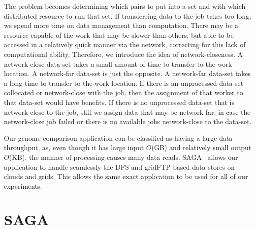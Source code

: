 \documentclass{rspublic}
\newcommand{\micnote}[1]{ {\textcolor{blue} { ***Michael: #1 }}}
\newcommand{\betynote}[1]{ {\textcolor{orange} { ***Bety: #1 }}}
\newcommand{\jhanote}[1]{} \newcommand{\micnote}[1]{}\newcommand{\betynote}[1]{} \newcommand{\fixme}[1]{}
\begin{document}
The problem becomes determining which pairs to put into a set and with which
distributed resource to run that set. If transferring data to the job
takes too long, we spend more time on data management than computation.
There may be a resource capable of the work that may be slower than
others, but able to be accessed in a relatively quick manner via the
network, correcting for this lack of computational ability. Therefore, we introduce the idea of network-closeness. A network-close data-set
takes a small amount of time to transfer to the work location. A
network-far data-set is just the opposite. A network-far data-set takes
a long time to transfer to the work location. If there is an
unprocessed data-set collocated or network-close with the job, then the
assignment of that worker to that data-set would have benefits. If
there is no unprocessed data-set that is network-close to the job, still
we assign data that may be network-far, in case the network-close job
failed or there is no available jobs network-close to the data-set.


Our genome comparison application can be classified as having a large
data throughput, as, even though it has large input $O$(GB) and
relatively small output $O$(KB), the manner of processing causes many
data reads. SAGA~\citep{saga_web} allows our application to handle
seamlessly the DFS and gridFTP based data stores on clouds and grids.
This allows the same exact application to be used for all of our
experiments. 

\section{SAGA} \label{Sec:SAGA}
\end{document}
